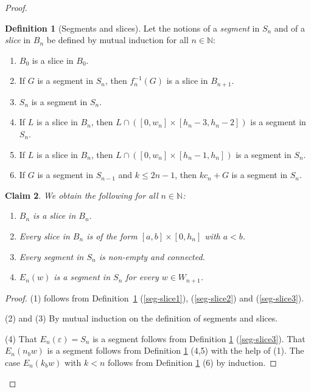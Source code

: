 \documentclass[a4paper]{amsart}
\def\IN{{\mathbb{N}}}
\newtheorem{localclaim}{Claim}[theorem]
\theoremstyle{definition}
\newtheorem{localdef}[localclaim]{Definition}
\begin{document}
\begin{proof}
\begin{localdef}[Segments and slices]
\label{def:segmentslice}
Let the notions of a \emph{segment} in $S_n$ and of a \emph{slice} in $B_n$ be defined by mutual induction for all $n\in\IN$:
\begin{enumerate}
\item\label{seg-slice1} $B_0$ is a slice in $B_0$.
\item\label{seg-slice2} If $G$ is a segment in $S_{n}$, then $f_{n}^{-1}(G)$ is a slice in $B_{n+1}$.
\item\label{seg-slice3} $S_n$ is a segment in $S_n$.
\item\label{seg-slice4} If $L$ is a slice in $B_n$, then $L\cap([0,w_n] \times [h_n-3, h_n-2])$ is a segment in $S_n$.
\item\label{seg-slice5} If $L$ is a slice in $B_n$, then $L\cap([0,w_n] \times [h_n-1, h_n])$ is a segment in $S_n$.
\item\label{seg-slice6} If $G$ is a segment in $S_{n-1}$ and $k \leq 2n-1$, then $kc_n + G$ is a segment in $S_n$.
\end{enumerate}
\end{localdef}

\begin{localclaim}
\label{claim:dim2-7}
We obtain the following for all $n\in\IN$:
\begin{enumerate}
\item $B_n$ is a slice in $B_n$.
\item Every slice in $B_n$ is of the form $[a,b] \times [0,h_n]$ with $a < b$.
\item Every segment in $S_n$ is non-empty and connected.
\item $E_n(w)$ is a segment in $S_n$ for every $w\in W_{n+1}$.
\end{enumerate}
\end{localclaim}
\begin{proof}
(1) follows from Definition~\ref{def:segmentslice} (\ref{seg-slice1}), (\ref{seg-slice2}) and (\ref{seg-slice3}).

(2) and (3) By mutual induction on the definition of segments and slices. 

(4) That $E_n(\varepsilon)=S_n$ is a segment follows from Definition \ref{def:segmentslice} (\ref{seg-slice3}). That $E_n(n_bw)$ is a segment follows from Definition \ref{def:segmentslice} (4,5) with the help of (1). The case $E_n(k_bw)$ with $k < n$ follows from Definition \ref{def:segmentslice} (6) by induction.
\end{proof}


\end{proof}
\end{document}
